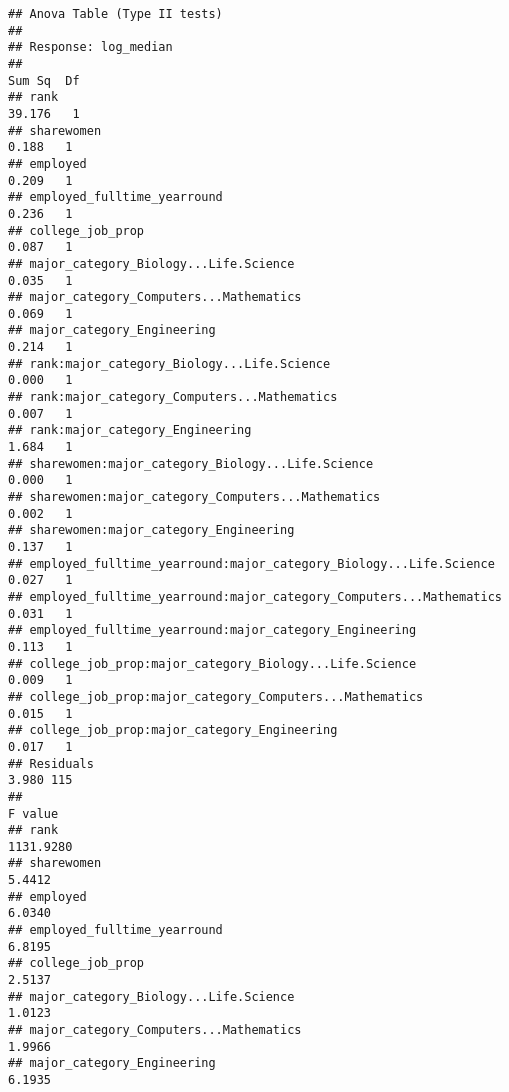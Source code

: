 \documentclass[
]{article}
\begin{document}
\begin{verbatim}
## Anova Table (Type II tests)
## 
## Response: log_median
##                                                                    Sum Sq  Df
## rank                                                               39.176   1
## sharewomen                                                          0.188   1
## employed                                                            0.209   1
## employed_fulltime_yearround                                         0.236   1
## college_job_prop                                                    0.087   1
## major_category_Biology...Life.Science                               0.035   1
## major_category_Computers...Mathematics                              0.069   1
## major_category_Engineering                                          0.214   1
## rank:major_category_Biology...Life.Science                          0.000   1
## rank:major_category_Computers...Mathematics                         0.007   1
## rank:major_category_Engineering                                     1.684   1
## sharewomen:major_category_Biology...Life.Science                    0.000   1
## sharewomen:major_category_Computers...Mathematics                   0.002   1
## sharewomen:major_category_Engineering                               0.137   1
## employed_fulltime_yearround:major_category_Biology...Life.Science   0.027   1
## employed_fulltime_yearround:major_category_Computers...Mathematics  0.031   1
## employed_fulltime_yearround:major_category_Engineering              0.113   1
## college_job_prop:major_category_Biology...Life.Science              0.009   1
## college_job_prop:major_category_Computers...Mathematics             0.015   1
## college_job_prop:major_category_Engineering                         0.017   1
## Residuals                                                           3.980 115
##                                                                      F value
## rank                                                               1131.9280
## sharewomen                                                            5.4412
## employed                                                              6.0340
## employed_fulltime_yearround                                           6.8195
## college_job_prop                                                      2.5137
## major_category_Biology...Life.Science                                 1.0123
## major_category_Computers...Mathematics                                1.9966
## major_category_Engineering                                            6.1935

\end{verbatim}
\end{document}
